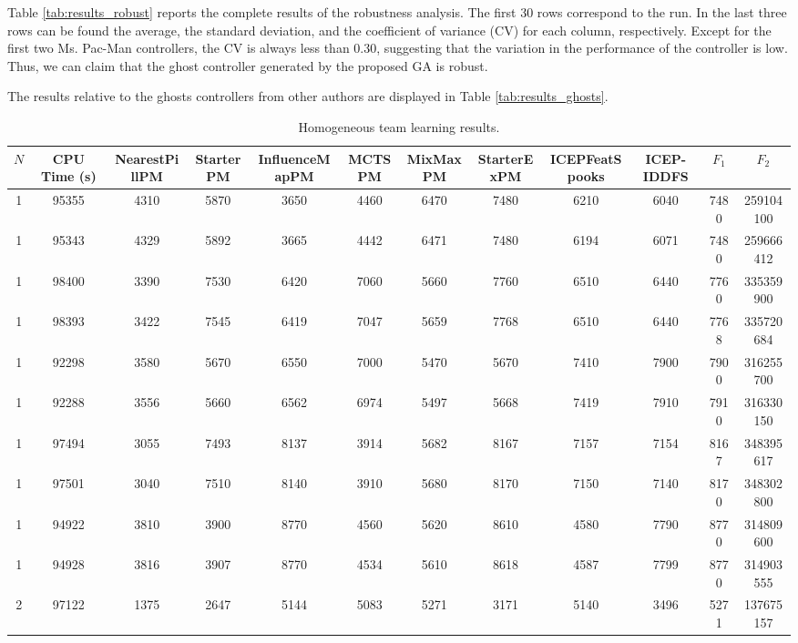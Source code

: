 \documentclass[journal]{IEEEtran}
\begin{document}
Table \ref{tab:results_robust} reports the complete results of the robustness analysis. The first 30 rows correspond to the run. In the last three rows can be found the average, the standard deviation, and the coefficient of variance (CV) for each column, respectively. Except for the first two Ms. Pac-Man controllers, the CV is always less than 0.30, suggesting that the variation in the performance of the controller is low. Thus, we can claim that the ghost controller generated by the proposed GA is robust.

The results relative to the ghosts controllers from other authors are displayed in Table \ref{tab:results_ghosts}.

\begin{table}
\caption{Homogeneous team learning results.}
\label{tab:results_homogeneous}
\centering
\footnotesize
\begin{tabular}{|cc|cccccccc|cc|}
\hline																							
$N$	&	CPU Time (s)	&	NearestPillPM	&	StarterPM	&	InfluenceMapPM	&	MCTSPM	&	MixMaxPM	&	StarterExPM	&	ICEPFeatSpooks	&	ICEP-IDDFS	&	$F_1$	&	$F_2$	\\
\hline																							
1	&	95355	&	4310	&	5870	&	3650	&	4460	&	6470	&	7480	&	6210	&	6040	&	7480	&	259104100	\\
1	&	95343	&	4329	&	5892	&	3665	&	4442	&	6471	&	7480	&	6194	&	6071	&	7480	&	259666412	\\
1	&	98400	&	3390	&	7530	&	6420	&	7060	&	5660	&	7760	&	6510	&	6440	&	7760	&	335359900	\\
1	&	98393	&	3422	&	7545	&	6419	&	7047	&	5659	&	7768	&	6510	&	6440	&	7768	&	335720684	\\
1	&	92298	&	3580	&	5670	&	6550	&	7000	&	5470	&	5670	&	7410	&	7900	&	7900	&	316255700	\\
1	&	92288	&	3556	&	5660	&	6562	&	6974	&	5497	&	5668	&	7419	&	7910	&	7910	&	316330150	\\
1	&	97494	&	3055	&	7493	&	8137	&	3914	&	5682	&	8167	&	7157	&	7154	&	8167	&	348395617	\\
1	&	97501	&	3040	&	7510	&	8140	&	3910	&	5680	&	8170	&	7150	&	7140	&	8170	&	348302800	\\
1	&	94922	&	3810	&	3900	&	8770	&	4560	&	5620	&	8610	&	4580	&	7790	&	8770	&	314809600	\\
1	&	94928	&	3816	&	3907	&	8770	&	4534	&	5610	&	8618	&	4587	&	7799	&	8770	&	314903555	\\
\hline																							
2	&	97122	&	1375	&	2647	&	5144	&	5083	&	5271	&	3171	&	5140	&	3496	&	5271	&	137675157	\\

\end{tabular}
\end{table}
\end{document}
